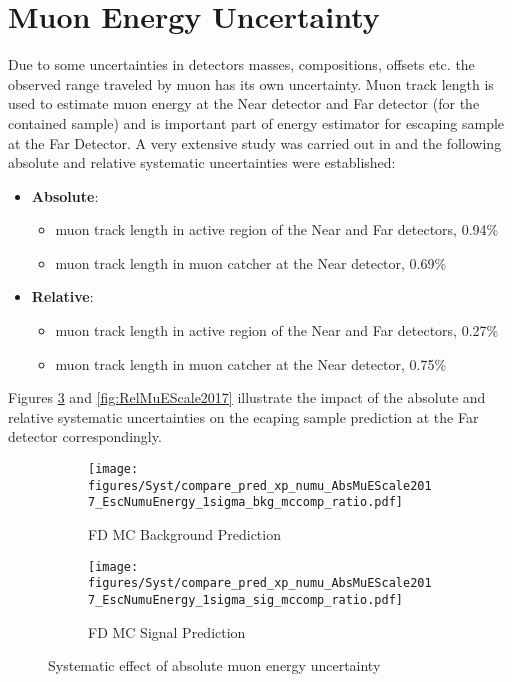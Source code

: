 \section{Muon Energy Uncertainty}
Due to some uncertainties in detectors masses, compositions, offsets etc. the observed range traveled by muon has its own 
uncertainty. Muon track length is used to estimate muon energy at the Near detector and Far detector (for the contained 
sample) and is important part of energy estimator for escaping sample at the Far Detector. A very extensive study was carried out
in \cite{muonEUnc_technote} and the following absolute and relative systematic uncertainties were established:
\begin{itemize}
\item \textbf{Absolute}: 
\begin{itemize}
	\item muon track length in active region of the Near and Far detectors, 0.94\%
	\item muon track length in muon catcher at the Near detector, 0.69\%
\end{itemize}
\item \textbf{Relative}:
\begin{itemize}
        \item muon track length in active region of the Near and Far detectors, 0.27\%
        \item muon track length in muon catcher at the Near detector, 0.75\%
\end{itemize}
\end{itemize}

Figures \ref{fig:AbsMuEScale2017} and \ref{fig:RelMuEScale2017} illustrate the impact of the absolute and relative systematic 
uncertainties on the ecaping sample prediction at the Far detector correspondingly.

\clearpage
\begin{figure}[t!]
\begin{subfigure}[t]{0.5\textwidth}
  \centering
  \texttt{[image: figures/Syst/compare\_pred\_xp\_numu\_AbsMuEScale2017\_EscNumuEnergy\_1sigma\_bkg\_mccomp\_ratio.pdf]}
  \caption{FD MC Background Prediction}
  \label{fig:bkg_AbsMuEScale2017}
\end{subfigure}%
\begin{subfigure}[t]{0.5\textwidth}
  \centering
  \texttt{[image: figures/Syst/compare\_pred\_xp\_numu\_AbsMuEScale2017\_EscNumuEnergy\_1sigma\_sig\_mccomp\_ratio.pdf]}
  \caption{FD MC Signal Prediction}
  \label{fig:sig_AbsMuEScale2017}
\end{subfigure}
\caption{ Systematic effect of absolute muon energy uncertainty }
\label{fig:AbsMuEScale2017}
\end{figure}

